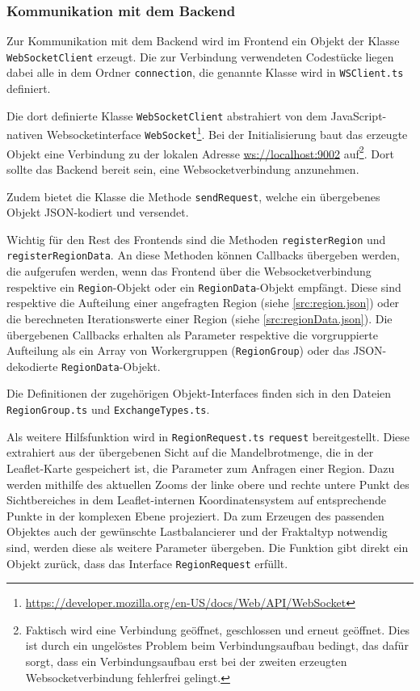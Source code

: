 \subsubsection{Kommunikation mit dem Backend}\label{sec:fontend_communication}

Zur Kommunikation mit dem Backend wird im Frontend ein Objekt der Klasse \texttt{WebSocketClient} erzeugt.
Die zur Verbindung verwendeten Codestücke liegen dabei alle in dem Ordner \verb|connection|, die genannte Klasse wird in
\verb|WSClient.ts| definiert.

Die dort definierte Klasse \verb|WebSocketClient| abstrahiert von dem JavaScript-nativen Websocketinterface \verb|WebSocket|\footnote{\url{https://developer.mozilla.org/en-US/docs/Web/API/WebSocket}}.
Bei der Initialisierung baut das erzeugte Objekt eine Verbindung zu der lokalen Adresse \url{ws://localhost:9002} auf\footnote{
	Faktisch wird eine Verbindung geöffnet, geschlossen und erneut geöffnet.
	Dies ist durch ein ungelöstes Problem beim Verbindungsaufbau bedingt, das dafür sorgt, dass ein Verbindungsaufbau
	erst bei der zweiten erzeugten Websocketverbindung fehlerfrei gelingt.
}.
Dort sollte das Backend bereit sein, eine Websocketverbindung anzunehmen.

Zudem bietet die Klasse die Methode \texttt{sendRequest}, welche ein übergebenes Objekt JSON-kodiert und versendet.

Wichtig für den Rest des Frontends sind die Methoden \texttt{registerRegion} und \texttt{registerRegionData}.
An diese Methoden können Callbacks übergeben werden, die aufgerufen werden, wenn das Frontend über die Websocketverbindung
respektive ein \texttt{Region}-Objekt oder ein \texttt{RegionData}-Objekt empfängt.
Diese sind respektive die Aufteilung einer angefragten Region (siehe \autoref{src:region.json})
oder die berechneten Iterationswerte einer Region (siehe \autoref{src:regionData.json}).
Die übergebenen Callbacks erhalten als Parameter respektive die vorgruppierte Aufteilung als ein Array von Workergruppen (\texttt{RegionGroup})
oder das JSON-dekodierte \verb|RegionData|-Objekt.

Die Definitionen der zugehörigen Objekt-Interfaces finden sich in den Dateien \texttt{RegionGroup.ts} und \texttt{ExchangeTypes.ts}.

Als weitere Hilfsfunktion wird in \verb|RegionRequest.ts| \verb|request| bereitgestellt.
Diese extrahiert aus der übergebenen Sicht auf die Mandelbrotmenge, die in der Leaflet-Karte gespeichert ist,
die Parameter zum Anfragen einer Region.
Dazu werden mithilfe des aktuellen Zooms der linke obere und rechte untere Punkt des Sichtbereiches
in dem Leaflet-internen Koordinatensystem auf entsprechende Punkte in der komplexen Ebene projeziert.
Da zum Erzeugen des passenden Objektes auch der gewünschte Lastbalancierer und der Fraktaltyp notwendig sind,
werden diese als weitere Parameter übergeben.
Die Funktion gibt direkt ein Objekt zurück, dass das Interface \verb|RegionRequest| erfüllt.

